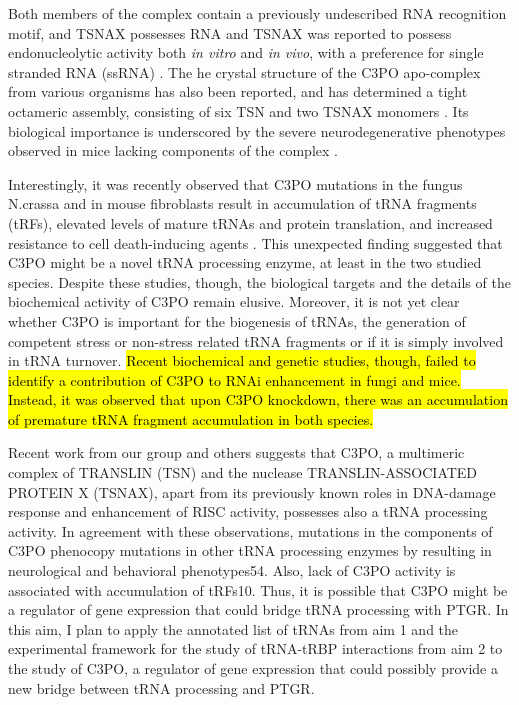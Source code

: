 \documentclass[12pt]{rockefeller}
\begin{document}
Both members of the complex contain a previously undescribed RNA recognition motif, and  TSNAX possesses RNA 	and TSNAX was reported to possess endonucleolytic activity both \textit{in vitro} and \textit{in vivo}, with a preference for single stranded RNA (ssRNA) \cite{Ye:2011bo, Tian:2011hx}. The he crystal structure of the C3PO apo-complex from various organisms has also been reported, and has determined a tight octameric assembly, consisting of six TSN and two TSNAX monomers \cite{Ye:2011bo, Tian:2011hx, Parizotto:2013dg}. Its biological importance is underscored by the severe neurodegenerative phenotypes observed in mice lacking components of the complex \cite{Stein:2006jj}. 

Interestingly, it was recently observed that C3PO mutations in the fungus N.crassa and in mouse fibroblasts result in accumulation of tRNA fragments (tRFs), elevated levels of mature tRNAs and protein translation, and increased resistance to cell death-inducing agents \cite{Li:2012kob}. This unexpected finding suggested that C3PO might be a novel tRNA processing enzyme, at least in the two studied species. Despite these studies, though, the biological targets and the details of the biochemical activity of C3PO remain elusive. Moreover, it is not yet clear whether C3PO is important for the biogenesis of tRNAs, the generation of competent stress or non-stress related tRNA fragments or if it is simply involved in tRNA turnover.       
\hl{Recent biochemical and genetic studies, though, failed to identify a contribution of 
	C3PO to RNAi enhancement in fungi and mice. Instead, it was observed that upon C3PO 
	knockdown, there was an accumulation of premature tRNA fragment accumulation in 
	both species.}





Recent work from our group and others suggests that C3PO, a multimeric complex of TRANSLIN (TSN) and the nuclease TRANSLIN-ASSOCIATED PROTEIN X (TSNAX), apart from its previously known roles in DNA-damage response and enhancement of RISC activity, possesses also a tRNA processing activity. In agreement with these observations, mutations in the components of C3PO phenocopy mutations in other tRNA processing enzymes by resulting in neurological and behavioral phenotypes54. Also, lack of C3PO activity is associated with accumulation of tRFs10. Thus, it is possible that C3PO might be a regulator of gene expression that could bridge tRNA processing with PTGR. In this aim, I plan to apply the annotated list of tRNAs from aim 1 and the experimental framework for the study of tRNA-tRBP interactions from aim 2 to the study of C3PO, a regulator of gene expression that could possibly provide a new bridge between tRNA processing and PTGR. 
\end{document}

